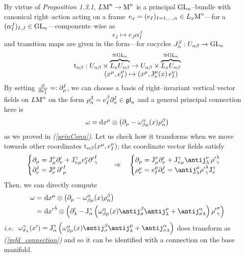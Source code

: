 \begin{example}\label{ex_1.3.3}
     By virtue of \emph{Proposition 1.3.1}, $L\text{\normalfont M}^n\to\text{\normalfont M}^n$ is a principal $\text{\normalfont GL}_n$--bundle with canonical right--action acting on a frame \,$\text{\normalfont e}_x=(e_I)_{I=1,\hdots,n}\in L_x\text{\normalfont M}^n$---for a $(\alpha^J_I)_{I,J}\in\text{\normalfont GL}_n$---components--wise as
    $$e_I\mapsto e_J\alpha^J_I$$
    and transition maps are given in the form---for cocycles $J_\alpha^\beta:U_{\alpha\beta}\to\text{\normalfont GL}_n$
    $$\begin{matrix}      \text{\normalfont t}_{\alpha\beta}:U_{\alpha\beta}\times\overbrace{L_xU_{\alpha\beta}}^{\cong\text{\normalfont GL}_n}\to U_{\alpha\beta}\times\overbrace{L_xU_{\alpha\beta}}^{\cong\text{\normalfont GL}_n}\\
    \qquad\qquad(x^\mu,e_I^\mu)\mapsto\left(x^\mu,\text{\normalfont J}^\mu_\nu(x)\,e^\nu_I\right)
    \end{matrix}$$
    By setting $\frac{\partial}{\partial e_I^\mu}=:\partial^I_\mu$, we can choose a basis of right--invariant vertical vector fields on $L\text{\normalfont M}^n$ on the form $\rho^\beta_\alpha=e^\beta_I\partial^I_\alpha\in\mathfrak{gl}_n$ and a general principal connection here is
    $$\omega=\text{\normalfont d} x^\mu\otimes\left(\partial_\mu-\omega^\alpha_{\beta\mu}(x)\rho^\beta_\alpha\right)$$
    as we proved in \emph{(\ref{prinConn})}. Let us check how it transforms when we move towards other coordinates $\text{\normalfont t}_{\alpha\beta}(x^\mu,e^\mu_I)$; the coordinate vector fields satisfy
    $$\begin{cases}
        \der_\mu=\J^\nu_\mu\der'_\nu+\J^\gamma_{\nu\mu}e^\nu_I{\der'}^I_\gamma\\
        \der^I_\nu=\J^\mu_\nu\,{\der'}^I_\mu
    \end{cases}\quad\Rightarrow\quad\begin{cases}
        \der_\mu=\J^\nu_\mu\der'_\nu+\J^\gamma_{\nu\mu}\antij^\nu_\lambda\,{\rho'}^\lambda_\gamma\\
        \rho^\mu_\nu=e^\mu_I\der^I_\nu=\antij^\mu_\lambda{\rho'}^\lambda_\gamma\J^\gamma_\nu
    \end{cases}$$
    Then, we can directly compute
    \begin{align*}
        \omega=&\,\,\d x^\mu\otimes\left(\der_\mu-\omega^\alpha_{\beta\mu}(x)\rho^\beta_\alpha\right)\\
        =&\,\,\d{x'}^\lambda\otimes\left(\der'_\lambda-\J^\gamma_\alpha\left(\omega^\alpha_{\beta\mu}(x)\antij^\beta_\sigma\antij^\mu_\lambda+\antij^\alpha_{\sigma\lambda}\right){\rho'}^\sigma_\gamma\right)
    \end{align*}
   \emph{ i.e.} $\,\,\omega^\gamma_{\sigma_\lambda}(x')=\J^\gamma_\alpha\left(\omega^\alpha_{\beta\mu}(x)\antij^\beta_\sigma\antij^\mu_\lambda+\antij^\alpha_{\sigma\lambda}\right)$ does transform as \emph{(\ref{mfd_connection})} and so it can be identified with a connection on the base manifold. 
\end{example}

